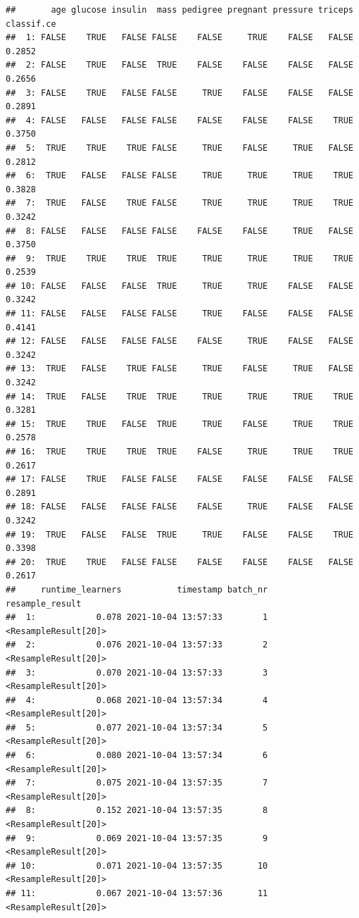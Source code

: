 \documentclass[
]{scrbook}
\begin{document}
\begin{verbatim}
##       age glucose insulin  mass pedigree pregnant pressure triceps classif.ce
##  1: FALSE    TRUE   FALSE FALSE    FALSE     TRUE    FALSE   FALSE     0.2852
##  2: FALSE    TRUE   FALSE  TRUE    FALSE    FALSE    FALSE   FALSE     0.2656
##  3: FALSE    TRUE   FALSE FALSE     TRUE    FALSE    FALSE   FALSE     0.2891
##  4: FALSE   FALSE   FALSE FALSE    FALSE    FALSE    FALSE    TRUE     0.3750
##  5:  TRUE    TRUE    TRUE FALSE     TRUE    FALSE     TRUE   FALSE     0.2812
##  6:  TRUE   FALSE   FALSE FALSE     TRUE     TRUE     TRUE    TRUE     0.3828
##  7:  TRUE   FALSE    TRUE FALSE     TRUE     TRUE     TRUE    TRUE     0.3242
##  8: FALSE   FALSE   FALSE FALSE    FALSE    FALSE     TRUE   FALSE     0.3750
##  9:  TRUE    TRUE    TRUE  TRUE     TRUE     TRUE     TRUE    TRUE     0.2539
## 10: FALSE   FALSE   FALSE  TRUE     TRUE     TRUE    FALSE   FALSE     0.3242
## 11: FALSE   FALSE   FALSE FALSE     TRUE    FALSE    FALSE   FALSE     0.4141
## 12: FALSE   FALSE   FALSE FALSE    FALSE     TRUE    FALSE   FALSE     0.3242
## 13:  TRUE   FALSE    TRUE FALSE     TRUE    FALSE     TRUE   FALSE     0.3242
## 14:  TRUE   FALSE    TRUE  TRUE     TRUE     TRUE     TRUE    TRUE     0.3281
## 15:  TRUE    TRUE   FALSE  TRUE     TRUE    FALSE     TRUE    TRUE     0.2578
## 16:  TRUE    TRUE    TRUE  TRUE    FALSE     TRUE     TRUE    TRUE     0.2617
## 17: FALSE    TRUE   FALSE FALSE    FALSE    FALSE    FALSE   FALSE     0.2891
## 18: FALSE   FALSE   FALSE FALSE    FALSE     TRUE    FALSE   FALSE     0.3242
## 19:  TRUE   FALSE   FALSE  TRUE     TRUE    FALSE    FALSE    TRUE     0.3398
## 20:  TRUE    TRUE   FALSE FALSE    FALSE    FALSE    FALSE   FALSE     0.2617
##     runtime_learners           timestamp batch_nr      resample_result
##  1:            0.078 2021-10-04 13:57:33        1 <ResampleResult[20]>
##  2:            0.076 2021-10-04 13:57:33        2 <ResampleResult[20]>
##  3:            0.070 2021-10-04 13:57:33        3 <ResampleResult[20]>
##  4:            0.068 2021-10-04 13:57:34        4 <ResampleResult[20]>
##  5:            0.077 2021-10-04 13:57:34        5 <ResampleResult[20]>
##  6:            0.080 2021-10-04 13:57:34        6 <ResampleResult[20]>
##  7:            0.075 2021-10-04 13:57:35        7 <ResampleResult[20]>
##  8:            0.152 2021-10-04 13:57:35        8 <ResampleResult[20]>
##  9:            0.069 2021-10-04 13:57:35        9 <ResampleResult[20]>
## 10:            0.071 2021-10-04 13:57:35       10 <ResampleResult[20]>
## 11:            0.067 2021-10-04 13:57:36       11 <ResampleResult[20]>

\end{verbatim}
\end{document}
